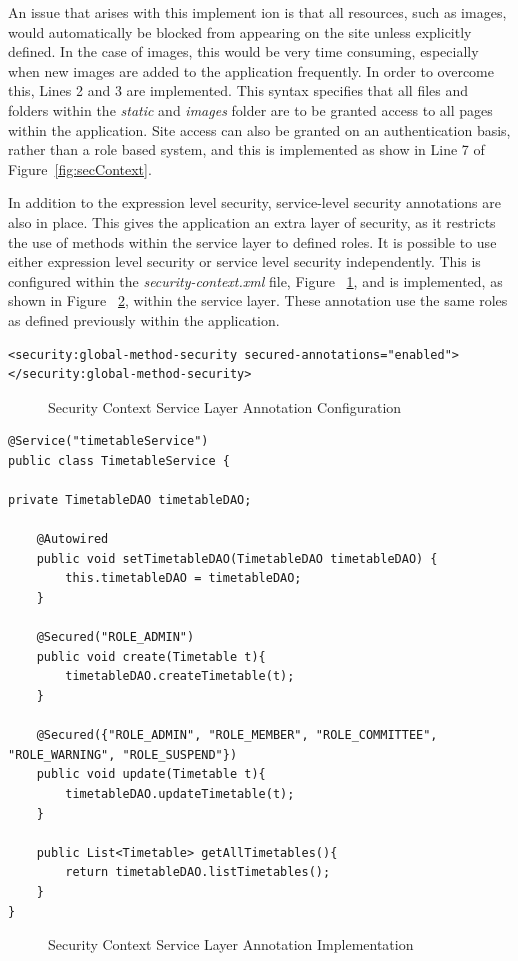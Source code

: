 An issue that arises with this implement ion is that all resources, such as images, would automatically be blocked from appearing on the site unless explicitly defined. In the case of images, this would be very time consuming, especially when new images are added to the application frequently. In order to overcome this, Lines 2 and 3 are implemented. This syntax specifies that all files and folders within the \textit{static} and \textit{images} folder are to be granted access to all pages within the application. Site access can also be granted on an authentication basis, rather than a role based system, and this is implemented as show in Line 7 of Figure~\ref{fig:secContext}.

In addition to the expression level security, service-level security annotations are also in place. This gives the application an extra layer of security, as it restricts the use of methods within the service layer to defined roles. It is possible to use either expression level security or service level security independently. This is configured within the \textit{security-context.xml} file, Figure ~\ref{fig:secAnnotate}, and is implemented, as shown in Figure ~\ref{fig:secAnonImpl}, within the service layer. These annotation use the same roles as defined previously within the application. 

\begin{lstlisting}
<security:global-method-security secured-annotations="enabled"></security:global-method-security>
\end{lstlisting}
\begin{figure}[H]
\caption{Security Context Service Layer Annotation Configuration}
\label{fig:secAnnotate}
\end{figure}

\begin{lstlisting}
@Service("timetableService")
public class TimetableService {

private TimetableDAO timetableDAO;

	@Autowired
	public void setTimetableDAO(TimetableDAO timetableDAO) {
		this.timetableDAO = timetableDAO;
	}
	
	@Secured("ROLE_ADMIN")
	public void create(Timetable t){
		timetableDAO.createTimetable(t);
	}
	
	@Secured({"ROLE_ADMIN", "ROLE_MEMBER", "ROLE_COMMITTEE", "ROLE_WARNING", "ROLE_SUSPEND"})
	public void update(Timetable t){
		timetableDAO.updateTimetable(t);
	}
	
	public List<Timetable> getAllTimetables(){
		return timetableDAO.listTimetables();
	}
}
\end{lstlisting}
\begin{figure}[H]
\caption{Security Context Service Layer Annotation Implementation}
\label{fig:secAnonImpl}
\end{figure}

